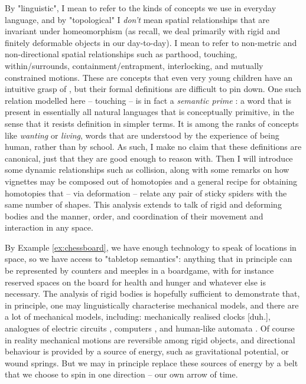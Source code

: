 By "linguistic", I mean to refer to the kinds of concepts we use in everyday language, and by "topological" I \emph{don't} mean spatial relationships that are invariant under homeomorphism (as recall, we deal primarily with rigid and finitely deformable objects in our day-to-day). I mean to refer to non-metric and non-directional spatial relationships such as parthood, touching, within/surrounds, containment/entrapment, interlocking, and mutually constrained motions. These are concepts that even very young children have an intuitive grasp of \citep{jean_childs_1967}, but their formal definitions are difficult to pin down. One such relation modelled here -- touching -- is in fact a \emph{semantic prime} \citep{wierzbicka_semantics_1996}: a word that is present in essentially all natural languages that is conceptually primitive, in the sense that it resists definition in simpler terms. It is among the ranks of concepts like \emph{wanting} or \emph{living}, words that are understood by the experience of being human, rather than by school. As such, I make no claim that these definitions are canonical, just that they are good enough to reason with. Then I will introduce some dynamic relationships such as collision, along with some remarks on how vignettes may be composed out of homotopies and a general recipe for obtaining homotopies that -- via deformation -- relate any pair of sticky spiders with the same number of shapes. This analysis extends to talk of rigid and deforming bodies and the manner, order, and coordination of their movement and interaction in any space.

 By Example \ref{ex:chessboard}, we have enough technology to speak of locations in space, so we have access to "tabletop semantics": anything that in principle can be represented by counters and meeples in a boardgame, with for instance reserved spaces on the board for health and hunger and whatever else is necessary. The analysis of rigid bodies is hopefully sufficient to demonstrate that, in principle, one may linguistically characterise mechanical models, and there are a lot of mechanical models, including: mechanically realised clocks [duh.], analogues of electric circuits \citep{noauthor_spintronics_nodate}, computers \citep{richard_ridel_mechanical_2015}, and human-like automata \citep{wikipedia_authors_jaquet-droz_2022}. Of course in reality mechanical motions are reversible among rigid objects, and directional behaviour is provided by a source of energy, such as gravitational potential, or wound springs. But we may in principle replace these sources of energy by a belt that we choose to spin in one direction -- our own arrow of time.

